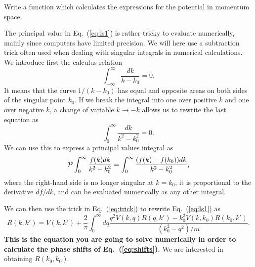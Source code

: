 \documentclass[prc]{revtex4}
\begin{document}
Write a function which calculates the expressions for the
potential in momentum space.

The principal value in Eq.\ (\ref{eq:ls1}) is rather tricky
to evaluate numerically, mainly since computers have limited
precision. We will here use a subtraction trick often used
when dealing with singular integrals in numerical calculations.
We introduce first the calculus relation
\begin{equation}
  \int_{-\infty}^{\infty} \frac{dk}{k-k_0} =0.
\end{equation}
It means that the curve $1/(k-k_0)$ has equal and opposite
areas on both sides of the singular point $k_0$. If we break
the integral into one over positive $k$ and one over 
negative $k$, a change of variable $k\rightarrow -k$ 
allows us to rewrite the last equation as
\begin{equation}
  \int_{0}^{\infty} \frac{dk}{k^2-k_0^2} =0.
\end{equation}
We can use this to express a principal values integral
as
\begin{equation}
  {\cal P}\int_{0}^{\infty} \frac{f(k)dk}{k^2-k_0^2} =
  \int_{0}^{\infty} \frac{(f(k)-f(k_0))dk}{k^2-k_0^2},
   \label{eq:trick}
\end{equation}
where the right-hand side is no longer singular at 
$k=k_0$, it is proportional to the derivative $df/dk$,
and can be evaluated numerically as any other integral.

We can then use the trick in Eq.\ (\ref{eq:trick}) to rewrite
Eq.\ (\ref{eq:ls1}) as
\begin{equation}
    R(k,k') = V(k,k') +\frac{2}{\pi}
                \int_0^{\infty}dq
                \frac{q^2V(k,q)R(q,k')-k_0^2V(k,k_0)R(k_0,k')  }
                     {(k_0^2-q^2)/m}.
   \label{eq:ls2}
\end{equation}
{\bf This is the equation you are going to solve numerically in order
to calculate the phase shifts of 
Eq.\ (\ref{eq:shifts}). } We are interested in obtaining
$R(k_0,k_0)$.
\end{document}
